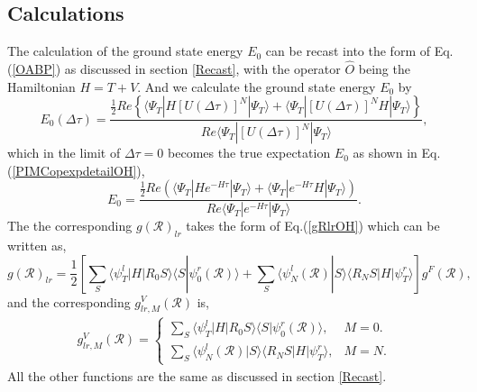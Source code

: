 \documentclass[12pt,letterpaper,UTF8]{report}
\begin{document}
\subsection{Calculations}
\label{secResultCalc}
The calculation of the ground state energy $E_0$ can be recast into the form of Eq.(\ref{OABP}) as discussed in section \ref{Recast}, with the operator $\hat{O}$ being the Hamiltonian $H=T+V$. And we calculate the ground state energy $E_0$ by
\begin{equation}
E_0 (\Delta \tau)
= \frac{
\frac{1}{2}  Re  \left\{  \langle \Psi_T| H [U(\Delta \tau)]^N  | \Psi_T \rangle
 +
 \langle \Psi_T|  [U(\Delta \tau)]^N H | \Psi_T \rangle
 \right\}
 }
{  Re \langle \Psi_T| [U(\Delta \tau)]^N  | \Psi_T \rangle} ,
\label{PIMCopexpdetailE0dtau}
\end{equation}
which in the limit of $\Delta \tau=0$ becomes the true expectation $E_0$ as shown in Eq.(\ref{PIMCopexpdetailOH}),
\begin{equation}
E_0
= \frac{
\frac{1}{2}  Re  \left(  \langle \Psi_T| H e^{-H \tau}  | \Psi_T \rangle
 +
 \langle \Psi_T|  e^{-H \tau} H | \Psi_T \rangle
 \right)
 }
{  Re \langle \Psi_T| e^{-H \tau} | \Psi_T \rangle} .
\label{PIMCopexpdetailE0}
\end{equation}
The the corresponding $g(\mathcal{R})_{lr}$ takes the form of Eq.(\ref{gRlrOH}) which can be written as,
\begin{equation}
  g(\mathcal{R})_{lr} = \frac{1}{2}
\left[
\sum\limits_{S} \langle \psi^l_T| H | R_0 S\rangle \langle S | \psi^r_0 (\mathcal{R}) \rangle
+ \sum\limits_{S} \langle \psi^l_N (\mathcal{R}) | S \rangle \langle R_N S| H | \psi^r_T \rangle
 \right]
g^F(\mathcal{R}),
\end{equation}
and the corresponding $g^V_{lr,M}(\mathcal{R})$ is,
\begin{align}
g^V_{lr,M}(\mathcal{R}) =
\begin{cases}
\sum\limits_{S} \langle \psi^l_T| H | R_0 S\rangle \langle S | \psi^r_0 (\mathcal{R}) \rangle,
 &  M=0. \\
\sum\limits_{S} \langle \psi^l_N (\mathcal{R}) | S \rangle \langle R_N S| H | \psi^r_T \rangle,
 & M=N .
\end{cases}
\label{gVRlrHdef}
\end{align}
All the other functions are the same as discussed in section \ref{Recast}.
\end{document}
